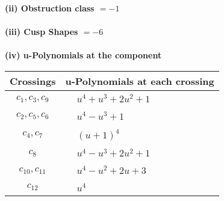 \documentclass[1p]{elsarticle_modified}
\theoremstyle{definition}
\begin{document}
\flushleft \textbf{(ii) Obstruction class $= -1$}\\~\\
\flushleft \textbf{(iii) Cusp Shapes $= -6$}\\~\\
\newpage\renewcommand{\arraystretch}{1}
\flushleft \textbf{(iv) u-Polynomials at the component}\newline \\
\begin{tabular}{m{50pt}|m{274pt}}
Crossings & \hspace{64pt}u-Polynomials at each crossing \\
\hline $$\begin{aligned}c_{1},c_{3},c_{9}\end{aligned}$$&$\begin{aligned}
&u^4+u^3+2 u^2+1
\end{aligned}$\\
\hline $$\begin{aligned}c_{2},c_{5},c_{6}\end{aligned}$$&$\begin{aligned}
&u^4- u^3+1
\end{aligned}$\\
\hline $$\begin{aligned}c_{4},c_{7}\end{aligned}$$&$\begin{aligned}
&(u+1)^4
\end{aligned}$\\
\hline $$\begin{aligned}c_{8}\end{aligned}$$&$\begin{aligned}
&u^4- u^3+2 u^2+1
\end{aligned}$\\
\hline $$\begin{aligned}c_{10},c_{11}\end{aligned}$$&$\begin{aligned}
&u^4- u^2+2 u+3
\end{aligned}$\\
\hline $$\begin{aligned}c_{12}\end{aligned}$$&$\begin{aligned}
&u^4
\end{aligned}$\\
\hline
\end{tabular}\\~\\
\end{document}
